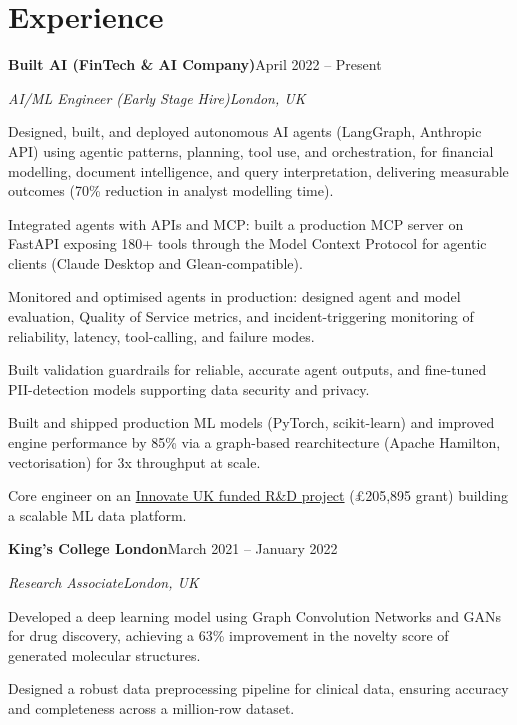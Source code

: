 \documentclass[10pt,a4paper]{article}
\newcommand{\entry}[4]{%
  {\color{company}\bfseries #1}\hfill {\color{muted}#2}\par
  \vspace{1pt}
  {\itshape #3}\hfill {\color{muted}\itshape #4}\par
  \vspace{3pt}%
}
\begin{document}
\section{Experience}
\entry{Built AI (FinTech \& AI Company)}{April 2022 -- Present}{AI/ML Engineer (Early Stage Hire)}{London, UK}
\begin{tight}
  \item Designed, built, and deployed autonomous AI agents (LangGraph, Anthropic API) using agentic patterns, planning, tool use, and orchestration, for financial modelling, document intelligence, and query interpretation, delivering measurable outcomes (70\% reduction in analyst modelling time).
  \item Integrated agents with APIs and MCP: built a production MCP server on FastAPI exposing 180+ tools through the Model Context Protocol for agentic clients (Claude Desktop and Glean-compatible).
  \item Monitored and optimised agents in production: designed agent and model evaluation, Quality of Service metrics, and incident-triggering monitoring of reliability, latency, tool-calling, and failure modes.
  \item Built validation guardrails for reliable, accurate agent outputs, and fine-tuned PII-detection models supporting data security and privacy.
  \item Built and shipped production ML models (PyTorch, scikit-learn) and improved engine performance by 85\% via a graph-based rearchitecture (Apache Hamilton, vectorisation) for 3x throughput at scale.
  \item Core engineer on an \href{https://gtr.ukri.org/projects?ref=10022996}{Innovate UK funded R\&D project} (\pounds205,895 grant) building a scalable ML data platform.
\end{tight}

\entry{King's College London}{March 2021 -- January 2022}{Research Associate}{London, UK}
\begin{tight}
  \item Developed a deep learning model using Graph Convolution Networks and GANs for drug discovery, achieving a 63\% improvement in the novelty score of generated molecular structures.
  \item Designed a robust data preprocessing pipeline for clinical data, ensuring accuracy and completeness across a million-row dataset.
\end{tight}
\end{document}
